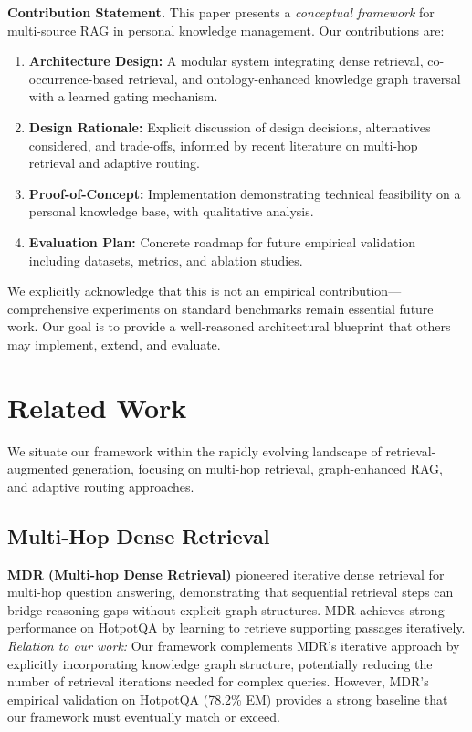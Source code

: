 \documentclass[11pt,a4paper]{article}
\begin{document}
\textbf{Contribution Statement.} This paper presents a \textit{conceptual framework} for multi-source RAG in personal knowledge management. Our contributions are:

\begin{enumerate}
    \item \textbf{Architecture Design:} A modular system integrating dense retrieval, co-occurrence-based retrieval, and ontology-enhanced knowledge graph traversal with a learned gating mechanism.
    
    \item \textbf{Design Rationale:} Explicit discussion of design decisions, alternatives considered, and trade-offs, informed by recent literature on multi-hop retrieval and adaptive routing.
    
    \item \textbf{Proof-of-Concept:} Implementation demonstrating technical feasibility on a personal knowledge base, with qualitative analysis.
    
    \item \textbf{Evaluation Plan:} Concrete roadmap for future empirical validation including datasets, metrics, and ablation studies.
\end{enumerate}

We explicitly acknowledge that this is not an empirical contribution---comprehensive experiments on standard benchmarks remain essential future work. Our goal is to provide a well-reasoned architectural blueprint that others may implement, extend, and evaluate.

\section{Related Work}
\label{sec:related_work}

We situate our framework within the rapidly evolving landscape of retrieval-augmented generation, focusing on multi-hop retrieval, graph-enhanced RAG, and adaptive routing approaches.

\subsection{Multi-Hop Dense Retrieval}

\textbf{MDR (Multi-hop Dense Retrieval)} \citep{xiong2021answering} pioneered iterative dense retrieval for multi-hop question answering, demonstrating that sequential retrieval steps can bridge reasoning gaps without explicit graph structures. MDR achieves strong performance on HotpotQA by learning to retrieve supporting passages iteratively. \textit{Relation to our work:} Our framework complements MDR's iterative approach by explicitly incorporating knowledge graph structure, potentially reducing the number of retrieval iterations needed for complex queries. However, MDR's empirical validation on HotpotQA (78.2\% EM) provides a strong baseline that our framework must eventually match or exceed.
\end{document}
